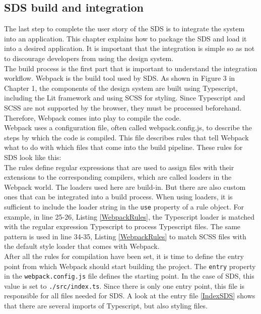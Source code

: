 \subsection{\ac{SDS} build and integration}\label{SDS_build_and_integration}
The last step to complete the user story of the \ac{SDS} is to integrate the system into an application. This chapter explains how to package the \ac{SDS} and load it into a desired application. It is important that the integration is simple so as not to discourage developers from using the design system. \\

The build process is the first part that is important to understand the integration workflow. Webpack is the build tool used by \ac{SDS}. As shown in Figure 3 in Chapter 1, the components of the design system are built using Typescript, including the Lit framework and using \ac{SCSS} for styling. Since Typescript and \ac{SCSS} are not supported by the browser, they must be processed beforehand. Therefore, Webpack comes into play to compile the code. \\
Webpack uses a configuration file, often called webpack.config.js, to describe the steps by which the code is compiled. This file describes rules that tell Webpack what to do with which files that come into the build pipeline. These rules for \ac{SDS} look like this:\\

The rules define regular expressions that are used to assign files with their extensions to the corresponding compilers, which are called loaders in the Webpack world. The loaders used here are build-in. But there are also custom ones that can be integrated into a build process. When using loaders, it is sufficient to include the loader string in the \texttt{use} property of a rule object. For example, in line 25-26, Listing \ref{WebpackRules}, the Typescript loader is matched with the regular expression Typescript to process Typescript files. The same pattern is used in line 34-35, Listing \ref{WebpackRules} to match \ac{SCSS} files with the default style loader that comes with Webpack.\\
After all the rules for compilation have been set, it is time to define the entry point from which Webpack should start building the project. The \texttt{entry} property in the \texttt{webpack.config.js} file defines the starting point. In the case of \ac{SDS}, this value is set to \texttt{./src/index.ts}. Since there is only one entry point, this file is responsible for all files needed for \ac{SDS}. A look at the entry file \ref{IndexSDS} shows that there are several imports of Typescript, but also styling files.
